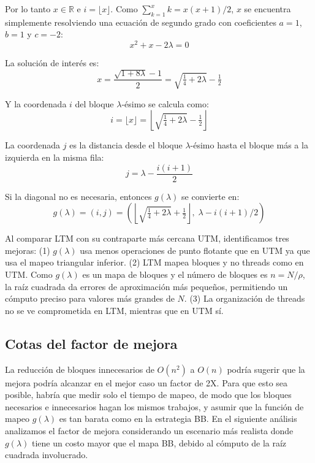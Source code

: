 \documentclass[twocolumn,10pt,a4paper]{article}
\begin{document}
Por lo tanto $x \in \mathbb{R}$ e $i = \lfloor x \rfloor$. Como
$\sum_{k=1}^{x} k = x(x+1)/2$, $x$ se encuentra simplemente resolviendo una
ecuación de segundo grado con coeficientes $a = 1$, $b = 1$ y $c = -2$:
\begin{equation}
x^2 + x - 2\lambda = 0
\label{eq:quadratic}
\end{equation}

La solución de interés es:
\begin{equation}
x = \frac{\sqrt{1 + 8\lambda} - 1}{2} = \sqrt{\tfrac{1}{4} + 2\lambda} - \tfrac{1}{2}
\label{eq:x_solution}
\end{equation}

Y la coordenada $i$ del bloque $\lambda$-ésimo se calcula como:
\begin{equation}
i = \lfloor x \rfloor = \left\lfloor \sqrt{\tfrac{1}{4} + 2\lambda} - \tfrac{1}{2} \right\rfloor
\label{eq:i_coord}
\end{equation}

La coordenada $j$ es la distancia desde el bloque $\lambda$-ésimo hasta el
bloque más a la izquierda en la misma fila:
\begin{equation}
j = \lambda - \frac{i(i+1)}{2}
\label{eq:j_coord}
\end{equation}

Si la diagonal no es necesaria, entonces $g(\lambda)$ se convierte en:
\begin{equation}
g(\lambda) = (i, j) = \left(
 \left\lfloor \sqrt{\tfrac{1}{4} + 2\lambda} + \tfrac{1}{2} \right\rfloor,
 \; \lambda - i(i+1)/2
\right)
\label{eq:g_no_diag}
\end{equation}

Al comparar LTM con su contraparte más cercana UTM, identificamos
tres mejoras: (1) $g(\lambda)$ usa menos operaciones de punto flotante que en
UTM ya que usa el mapeo triangular inferior. (2) LTM mapea bloques y no threads
como en UTM. Como $g(\lambda)$ es un mapa de bloques y el número de bloques
es $n = N/\rho$, la raíz cuadrada da errores de aproximación más pequeños,
permitiendo un cómputo preciso para valores más grandes de $N$. (3) La
organización de threads no se ve comprometida en LTM, mientras que en UTM sí.

\subsection{Cotas del factor de mejora}

La reducción de bloques innecesarios de $O(n^2)$ a $O(n)$ podría sugerir que
la mejora podría alcanzar en el mejor caso un factor de 2X. Para que esto sea
posible, habría que medir solo el tiempo de mapeo, de modo que los bloques
necesarios e innecesarios hagan los mismos trabajos, y asumir que la función
de mapeo $g(\lambda)$ es tan barata como en la estrategia BB. En el siguiente
análisis analizamos el factor de mejora considerando un escenario más realista
donde $g(\lambda)$ tiene un costo mayor que el mapa BB, debido al cómputo de
la raíz cuadrada involucrado.
\end{document}
